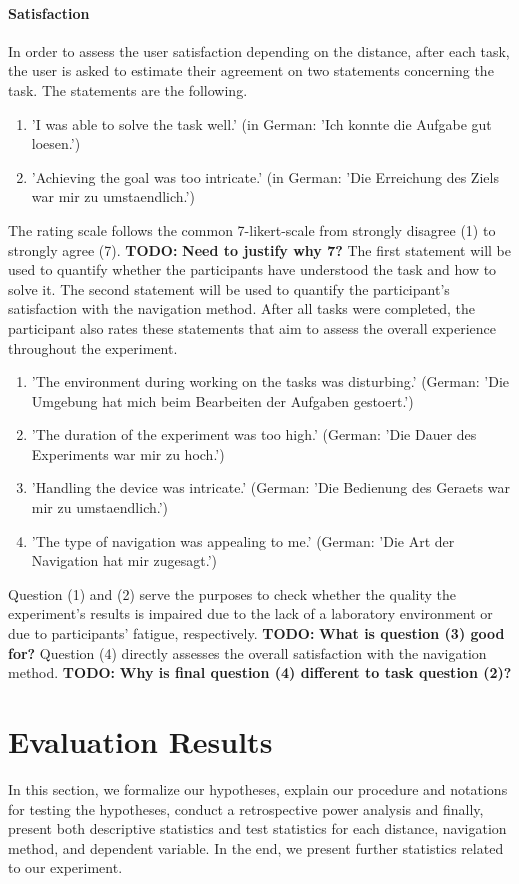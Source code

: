 \documentclass{sig-alternate-05-2015}
\newcommand{\todo}{\textbf{TODO:} \textbf}
\begin{document}
\paragraph{Satisfaction}
In order to assess the user satisfaction depending on the distance, after each task, the user is asked to estimate their
agreement on two statements concerning the task. The statements are the following.
\begin{enumerate}
  \item 'I was able to solve the task well.' (in German: 'Ich konnte die Aufgabe gut loesen.')
  \item 'Achieving the goal was too intricate.' (in German: 'Die Erreichung des Ziels war mir zu umstaendlich.')
\end{enumerate}
The rating scale follows the common 7-likert-scale from strongly disagree (1) to strongly agree (7). \todo{Need to justify why 7?}
The first statement will be used to quantify whether the participants have understood the task and how to solve it. The second statement will
be used to quantify the participant's satisfaction with the navigation method.
After all tasks were completed, the participant also rates these statements that aim to assess the overall experience throughout the experiment.
\begin{enumerate}
  \item 'The environment during working on the tasks was disturbing.' (German: 'Die Umgebung hat mich beim Bearbeiten der Aufgaben gestoert.')
  \item 'The duration of the experiment was too high.' (German: 'Die Dauer des Experiments war mir zu hoch.')
  \item 'Handling the device was intricate.' (German: 'Die Bedienung des Geraets war mir zu umstaendlich.')
  \item 'The type of navigation was appealing to me.' (German: 'Die Art der Navigation hat mir zugesagt.')
\end{enumerate}
Question (1) and (2) serve the purposes to check whether the quality the experiment's results is impaired due to the lack of a laboratory environment or
due to participants' fatigue, respectively. \todo{What is question (3) good for?} Question (4) directly assesses the overall satisfaction with the navigation method.
\todo{Why is final question (4) different to task question (2)?}
\section{Evaluation Results}
In this section, we formalize our hypotheses, explain our procedure and notations for testing the hypotheses, conduct a retrospective power analysis and finally, present both descriptive statistics
and test statistics for each distance, navigation method, and dependent variable. In the end, we present further statistics related to our experiment.
\end{document}
